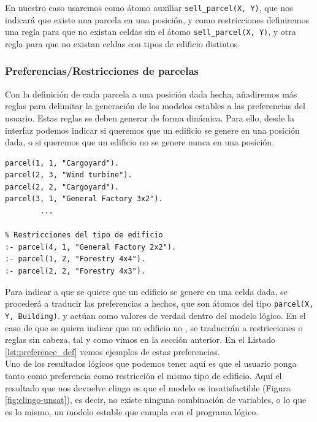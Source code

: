 En nuestro caso usaremos como átomo auxiliar \texttt{sell\_parcel(X, Y)}, que nos indicará que existe una parcela en una posición, y como restricciones definiremos una regla para que no existan celdas sin el átomo \texttt{sell\_parcel(X, Y)}, y otra regla para que no existan celdas con tipos de edificio distintos.

\subsubsection{Preferencias/Restricciones de parcelas}

Con la definición de cada parcela a una posición dada hecha, añadiremos más reglas para delimitar la generación de los modelos estables a las preferencias del usuario. Estas reglas se deben generar de forma dinámica. Para ello, desde la interfaz podemos indicar si queremos que un edificio se genere en una posición dada, o si queremos que un edificio no se genere nunca en una posición. \\

\begin{lstlisting}[caption={Preferencias de parcelas},captionpos=b,label=lst:preference_def]
% Preferencia de colocacion de parcelas
parcel(1, 1, "Cargoyard").
parcel(2, 3, "Wind turbine").
parcel(2, 2, "Cargoyard").
parcel(3, 1, "General Factory 3x2").
        ...

% Restricciones del tipo de edificio
:- parcel(4, 1, "General Factory 2x2").
:- parcel(1, 2, "Forestry 4x4").
:- parcel(2, 2, "Forestry 4x3").
\end{lstlisting}

Para indicar a \clingo que se quiere que un edificio se genere en una celda dada, se procederá a traducir las preferencias a hechos, que son átomos del tipo \texttt{parcel(X, Y, Building)}. y actúan como valores de verdad dentro del modelo lógico. En el caso de que se quiera indicar que un edificio no , se traducirán a restricciones o reglas sin cabeza, tal y como vimos en la sección anterior. En el Listado \ref{lst:preference_def} vemos ejemplos de estas preferencias. \\

Uno de los resultados lógicos que podemos tener aquí es que el usuario ponga tanto como preferencia como restricción el mismo tipo de edificio. Aquí el resultado que nos devuelve clingo es que el modelo es insatisfactible (Figura \ref{fig:clingo-unsat}), es decir, no existe ninguna combinación de variables, o lo que es lo mismo, un modelo estable que cumpla con el programa lógico. \\

